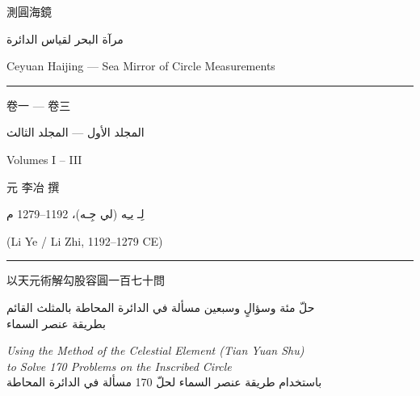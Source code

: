 \documentclass[11pt,a4paper]{article}
\newcommand{\ar}[1]{\arabicfont\beginR #1\endR}
\begin{document}
\begin{titlepage}
\centering
\vspace*{1.5cm}

{\fontsize{36}{44}\selectfont{}\color{titlecolor}
測圓海鏡}

\vspace{0.6cm}

{\fontsize{16}{20}\selectfont\color{sectioncolor}
\ar{مرآة البحر لقياس الدائرة}}

\vspace{0.3cm}

{\fontsize{14}{18}\selectfont\color{sectioncolor}
Ceyuan Haijing — Sea Mirror of Circle Measurements}

\vspace{0.4cm}

{\large\color{rulecolor}\rule{0.6\textwidth}{0.4pt}}

\vspace{0.6cm}

{\LARGE 卷一 — 卷三}

{\large\color{sectioncolor}
\ar{المجلد الأول — المجلد الثالث}}

{\large Volumes I – III}

\vspace{1.2cm}

{\large\color{sectioncolor}
元 \quad 李冶 \quad 撰}

\vspace{0.3cm}

{\normalsize\color{sectioncolor}
\ar{لِـ يـِه (لي جِـه)، 1192–1279 م}}

{\normalsize\color{sectioncolor}
(Li Ye / Li Zhi, 1192–1279 CE)}

\vspace{1.5cm}

{\color{rulecolor}\rule{0.4\textwidth}{0.4pt}}

\vspace{0.8cm}

{\normalsize
以天元術解勾股容圓一百七十問}

\vspace{0.2cm}

{\normalsize\color{sectioncolor}
\ar{حلّ مئة وسؤالٍ وسبعين مسألة في الدائرة المحاطة بالمثلث القائم\\
بطريقة عنصر السماء}}

\vspace{0.4cm}

{\small\color{notecolor}
\textit{Using the Method of the Celestial Element (Tian Yuan Shu)}\\
\textit{to Solve 170 Problems on the Inscribed Circle}\\
\ar{باستخدام طريقة عنصر السماء لحلّ 170 مسألة في الدائرة المحاطة}}


\end{titlepage}
\end{document}

